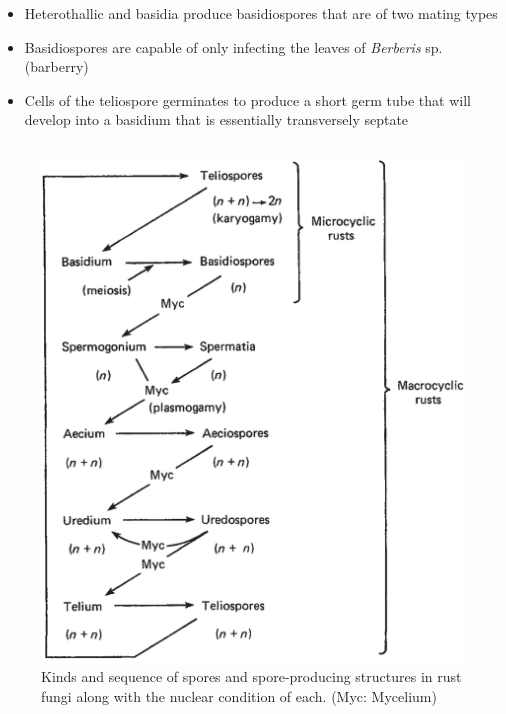 \documentclass[10pt,dvipsnames,ignorenonframetext,aspectratio=169]{beamer}
\providecommand{\tightlist}{%
  \setlength{\itemsep}{0pt}\setlength{\parskip}{0pt}}
\begin{document}
\begin{frame}{}
\begin{itemize}
\begin{itemize}
    \begin{itemize}
    \tightlist
    \item
      Heterothallic and basidia produce basidiospores that are of two
      mating types
    \item
      Basidiospores are capable of only infecting the leaves of
      \textit{Berberis} sp. (barberry)
    \item
      Cells of the teliospore germinates to produce a short germ tube
      that will develop into a basidium that is essentially transversely
      septate
    \end{itemize}
  \end{itemize}
\end{itemize}
\end{frame}

\begin{frame}{}
\protect\hypertarget{section-2}{}
\begin{columns}[T, onlytextwidth]

\begin{figure}
\includegraphics[width=0.9\linewidth]{../images/spores_rust_fungi} \caption{Kinds and sequence of spores and spore-producing structures in rust fungi along with the nuclear condition of each. (Myc: Mycelium)}\label{fig:rust-spores-structures}
\end{figure}


\end{columns}
\end{frame}
\end{document}
